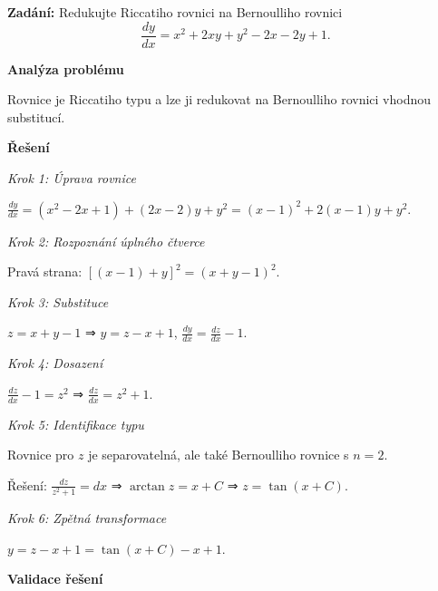         \begin{example}
        \label{ex:a3-slozity-redukce}
        
        \noindent\textbf{Zadání:} Redukujte Riccatiho rovnici na Bernoulliho rovnici
        \[
        \frac{dy}{dx} = x^2 + 2xy + y^2 - 2x - 2y + 1.
        \]
        
        \vspace{1.5\baselineskip}
        
        \noindent\textbf{Analýza problému}
        
        \noindent Rovnice je Riccatiho typu a lze ji redukovat na Bernoulliho rovnici 
        vhodnou substitucí.
        
        \vspace{1.5\baselineskip}
        
        \noindent\textbf{Řešení}
        
        \noindent\textit{Krok 1: Úprava rovnice}
        
        $\frac{dy}{dx} = (x^2 - 2x + 1) + (2x - 2)y + y^2 = (x - 1)^2 + 2(x - 1)y + y^2$.
        
        \noindent\textit{Krok 2: Rozpoznání úplného čtverce}
        
        Pravá strana: $[(x - 1) + y]^2 = (x + y - 1)^2$.
        
        \noindent\textit{Krok 3: Substituce}
        
        $z = x + y - 1$ ⇒ $y = z - x + 1$, $\frac{dy}{dx} = \frac{dz}{dx} - 1$.
        
        \noindent\textit{Krok 4: Dosazení}
        
        $\frac{dz}{dx} - 1 = z^2$ ⇒ $\frac{dz}{dx} = z^2 + 1$.
        
        \noindent\textit{Krok 5: Identifikace typu}
        
        Rovnice pro $z$ je separovatelná, ale také Bernoulliho rovnice s $n = 2$.
        
        Řešení: $\frac{dz}{z^2 + 1} = dx$ ⇒ $\arctan z = x + C$ ⇒ $z = \tan(x + C)$.
        
        \noindent\textit{Krok 6: Zpětná transformace}
        
        $y = z - x + 1 = \tan(x + C) - x + 1$.
        
        \vspace{1.5\baselineskip}
        
        \noindent\textbf{Validace řešení}
        

\end{example}
